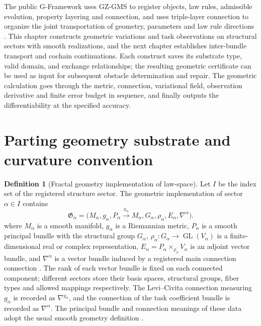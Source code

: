 \documentclass[12pt,a4paper,openany,notitlepage]{report}
\theoremstyle{plain}
\theoremstyle{definition}
\newtheorem{definition}[theorem]{Definition}
\theoremstyle{remark}
\begin{document}
\begin{CJK*}
The public G-Framework uses GZ-GMS to register objects, law rules, admissible evolution, property layering and connection, and uses triple-layer connection to organize the joint transportation of geometry, parameters and law rule directions \cite{S01,GFrameworkSynthesis}. This chapter constructs geometric variations and task observations on structural sectors with smooth realizations, and the next chapter establishes inter-bundle transport and cochain continuations. Each construct saves its substrate type, valid domain, and exchange relationships; the resulting geometric certificate can be used as input for subsequent obstacle determination and repair. The geometric calculation goes through the metric, connection, variational field, observation derivative and finite error budget in sequence, and finally outputs the differentiability at the specified accuracy.

\section { Parting geometry substrate and curvature convention }\label{hgov:geo:typed}


\begin{definition}
[Fractal geometry implementation of law-space]\label{hgov:geo:def:sector}
Let $I$ be the index set of the registered structure sector. The geometric implementation of sector $\alpha\in I$ contains \[
\mathfrak G_\alpha=
\bigl(M_\alpha,g_\alpha,
P_\alpha\xrightarrow{\pi_\alpha}M_\alpha,
G_\alpha,\rho_\alpha,E_\alpha,\nabla^\alpha\bigr).
\] where $M_\alpha$ is a smooth manifold, $g_\alpha$ is a Riemannian metric, $P_\alpha$ is a smooth principal bundle with the structural group $G_\alpha$, $\rho_\alpha:G_\alpha\to\operatorname{GL}(V_\alpha)$ is a finite-dimensional real or complex representation, $E_\alpha=P_\alpha\times_{\rho_\alpha}V_\alpha$ is an adjoint vector bundle, and $\nabla^\alpha$ is a vector bundle induced by a registered main connection connection . The rank of each vector bundle is fixed on each connected component; different sectors store their basis spaces, structural groups, fiber types and allowed mappings respectively. The Levi--Civita connection measuring $g_\alpha$ is recorded as $\nabla^{g_\alpha}$, and the connection of the task coefficient bundle is recorded as $\nabla^\alpha$. The principal bundle and connection meanings of these data adopt the usual smooth geometry definition \cite{ExtKobayashiNomizu}.\end{definition}



\end{CJK*}
\end{document}
